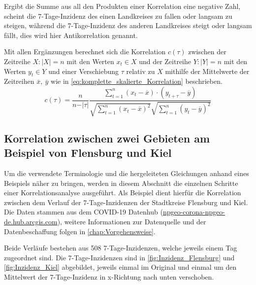 Ergibt die Summe aus all den Produkten einer Korrelation eine negative Zahl, scheint die 7-Tage-Inzidenz des einen Landkreises zu fallen oder langsam zu steigen, während die 7-Tage-Inzidenz des anderen Landkreises steigt oder langsam fällt, dies wird hier Antikorrelation genannt.

Mit allen Ergänzungen berechnet sich die Korrelation $c(\tau)$ zwischen der Zeitreihe $X:|X|=n$ mit den Werten $x_t\in X$ und der Zeitreihe $Y:|Y|=n$ mit den Werten $y_t \in Y$ und einer Verschiebung $\tau$ relativ zu $X$ mithilfe der Mittelwerte der Zeitreihen $\overline x,\ \overline y$ wie in \autoref{eq:komplette_skalierte_Korrelation} beschrieben.
\begin{equation}\label{eq:komplette_skalierte_Korrelation}
    c(\tau) =\frac{n}{n-\vert\tau\vert}
    \frac{\sum_{t=1}^n (x_t-\overline x)\cdot (y_{t+\tau}-\overline y)}{\sqrt{\sum_{t=1}^n (x_t-\overline x)^2}\sqrt{\sum_{t=1}^n (y_t-\overline y)^2}}
\end{equation}

\subsection{Korrelation zwischen zwei Gebieten am Beispiel von Flensburg und Kiel}
Um die verwendete Terminologie und die hergeleiteten Gleichungen anhand eines Beispiels näher zu bringen, werden in diesem Abschnitt die einzelnen Schritte einer Korrelationsanalyse ausgeführt. Als Beispiel dient hierfür die Korrelation zwischen dem Verlauf der 7-Tage-Inzidenzen der Stadtkreise Flensburg und Kiel. Die Daten stammen aus dem \glqq{}COVID-19 Datenhub\grqq{}
(\href{npgeo-corona-npgeo-de.hub.arcgis.com}{npgeo-corona-npgeo-de.hub.arcgis.com}), weitere Informationen zur Datenquelle und der Datenbeschaffung folgen in \autoref{chap:Vorgehensweise}.

Beide Verläufe bestehen aus 508 7-Tage-Inzidenzen, welche jeweils einem Tag zugeordnet sind. Die 7-Tage-Inzidenzen sind in \autoref{fig:Inzidenz_Flensburg} und \autoref{fig:Inzidenz_Kiel} abgebildet, jeweils einmal im Original und einmal um den Mittelwert der 7-Tage-Inzidenz in x-Richtung nach unten verschoben.

